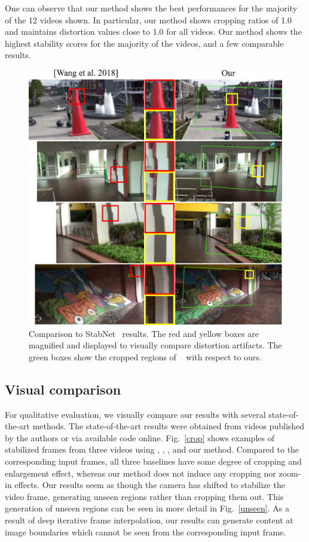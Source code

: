 One can observe that our method shows the best performances for the majority of the 12 videos shown.
In particular, our method shows cropping ratios of 1.0 and maintains distortion values close to 1.0 for all videos.
Our method shows the highest stability scores for the majority of the videos, and a few comparable results.

\begin{figure}
	\includegraphics[width=1\linewidth,keepaspectratio]{distortion}
	\caption{Comparison to StabNet~\cite{wang2018deep} results. The red and yellow boxes are magnified and displayed to visually compare distortion artifacts. The green boxes show the cropped regions of ~\cite{wang2018deep} with respect to ours.}
	\label{distortion}
	\vspace{-5mm}
\end{figure}

\subsection{Visual comparison}
For qualitative evaluation, we visually compare our results with several state-of-the-art methods.
The state-of-the-art results were obtained from videos published by the authors or via available code online. 
Fig.~\ref{crop} shows examples of stabilized frames from three videos using \cite{liu2013bundled}, \cite{grundmann2011auto}, \cite{liu2016meshflow}, and our method.
Compared to the corresponding input frames, all three baselines have some degree of cropping and enlargement effect, whereas our method does not induce any cropping nor zoom-in effects.
Our results seem as though the camera has shifted to stabilize the video frame, generating unseen regions rather than cropping them out.
This generation of unseen regions can be seen in more detail in Fig.~\ref{unseen}.
As a result of deep iterative frame interpolation, our results can generate content at image boundaries which cannot be seen from the corresponding input frame.

